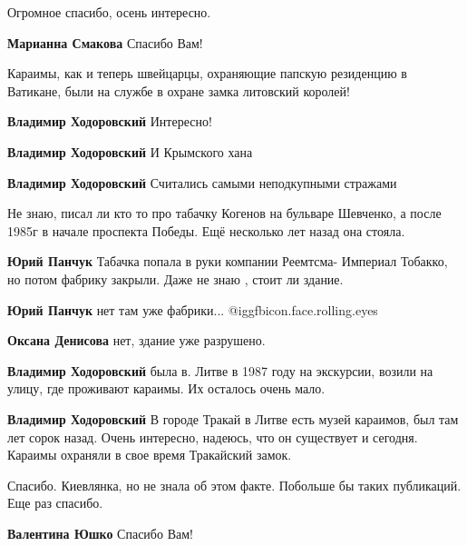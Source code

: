 \begin{itemize}
Огромное спасибо, осень интересно.

\begin{itemize} %
\textbf{Марианна Смакова} Спасибо Вам!
\end{itemize} %


Караимы, как и теперь швейцарцы, охраняющие папскую резиденцию в Ватикане, были
на службе в охране замка литовский королей!

\begin{itemize} %
\textbf{Владимир Ходоровский} Интересно!

\textbf{Владимир Ходоровский} И Крымского хана

\textbf{Владимир Ходоровский} Считались самыми неподкупными стражами


Не знаю, писал ли кто то про табачку Когенов на бульваре Шевченко, а после
1985г в начале проспекта Победы. Ещё несколько лет назад она стояла.

\begin{itemize} %
\textbf{Юрий Панчук} Табачка попала в руки компании Реемтсма- Империал Тобакко, но потом фабрику закрыли. Даже не знаю , стоит ли здание.

\textbf{Юрий Панчук} нет там уже фабрики... @igg{fbicon.face.rolling.eyes} 

\textbf{Оксана Денисова} нет, здание уже разрушено.
\end{itemize} %

\textbf{Владимир Ходоровский} была в. Литве в 1987 году на экскурсии, возили на улицу, где проживают караимы. Их осталось очень мало.

\textbf{Владимир Ходоровский} В городе Тракай в Литве есть музей караимов, был там лет сорок назад. Очень интересно, надеюсь, что он существует и сегодня. Караимы охраняли в свое время Тракайский замок.

\end{itemize} %

Спасибо. Киевлянка, но не знала об этом факте. Побольше бы таких публикаций. Еще раз спасибо.

\begin{itemize} %
\textbf{Валентина Юшко} Спасибо Вам!
\end{itemize} %


\end{itemize}
